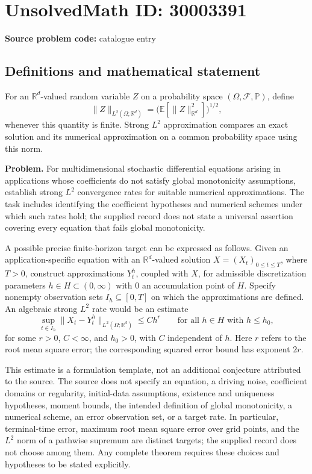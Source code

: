\documentclass[11pt]{article}
\newcommand{\R}{\mathbb{R}}
\newcommand{\E}{\mathbb{E}}
\begin{document}
\section*{UnsolvedMath ID: 30003391}
\textbf{Source problem code:} catalogue entry
\subsection{Definitions and mathematical statement}
For an \(\R^d\)-valued random variable \(Z\) on a probability space \((\Omega,\mathcal F,\mathbb P)\), define
\[
\|Z\|_{L^2(\Omega;\R^d)}=\bigl(\E[\|Z\|_{\R^d}^2]\bigr)^{1/2},
\]
whenever this quantity is finite. Strong \(L^2\) approximation compares an exact solution and its numerical approximation on a common probability space using this norm.

\textbf{Problem.} For multidimensional stochastic differential equations arising in applications whose coefficients do not satisfy global monotonicity assumptions, establish strong \(L^2\) convergence rates for suitable numerical approximations. The task includes identifying the coefficient hypotheses and numerical schemes under which such rates hold; the supplied record does not state a universal assertion covering every equation that fails global monotonicity.

A possible precise finite-horizon target can be expressed as follows. Given an application-specific equation with an \(\R^d\)-valued solution \(X=(X_t)_{0\leq t\leq T}\), where \(T>0\), construct approximations \(Y_t^h\), coupled with \(X\), for admissible discretization parameters \(h\in H\subset(0,\infty)\) with \(0\) an accumulation point of \(H\). Specify nonempty observation sets \(I_h\subseteq[0,T]\) on which the approximations are defined. An algebraic strong \(L^2\) rate would be an estimate
\[
\sup_{t\in I_h}\|X_t-Y_t^h\|_{L^2(\Omega;\R^d)}\leq C h^r
\qquad\text{for all }h\in H\text{ with }h\leq h_0,
\]
for some \(r>0\), \(C<\infty\), and \(h_0>0\), with \(C\) independent of \(h\). Here \(r\) refers to the root mean square error; the corresponding squared error bound has exponent \(2r\).

This estimate is a formulation template, not an additional conjecture attributed to the source. The source does not specify an equation, a driving noise, coefficient domains or regularity, initial-data assumptions, existence and uniqueness hypotheses, moment bounds, the intended definition of global monotonicity, a numerical scheme, an error observation set, or a target rate. In particular, terminal-time error, maximum root mean square error over grid points, and the \(L^2\) norm of a pathwise supremum are distinct targets; the supplied record does not choose among them. Any complete theorem requires these choices and hypotheses to be stated explicitly.
\end{document}
